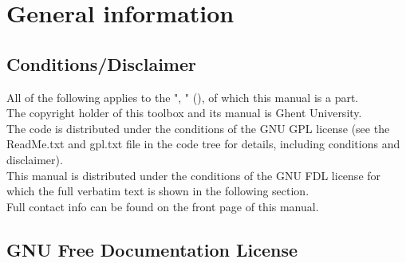 
\chapter{General information}
\hypertarget{ReferenceManual:GeneralInformation}{}

\section{Conditions/Disclaimer}

All of the following applies to the "\IPEMShortTitle,
\IPEMFullTitle" (\IPEMVersion), of which this
manual is a part.\\

The copyright holder of this toolbox and its manual is Ghent
University.\\

The code is distributed under the conditions of the GNU GPL
license (see the ReadMe.txt and gpl.txt file in the code tree for
details, including conditions and disclaimer).\\

This manual is distributed under the conditions of the GNU FDL
license for which the full verbatim text is shown in the following
section.\\

Full contact info can be found on the front page of this manual.


\section{GNU Free Documentation License}
\hypertarget{ReferenceManual:GNUFreeDocumentationLicense}{}

